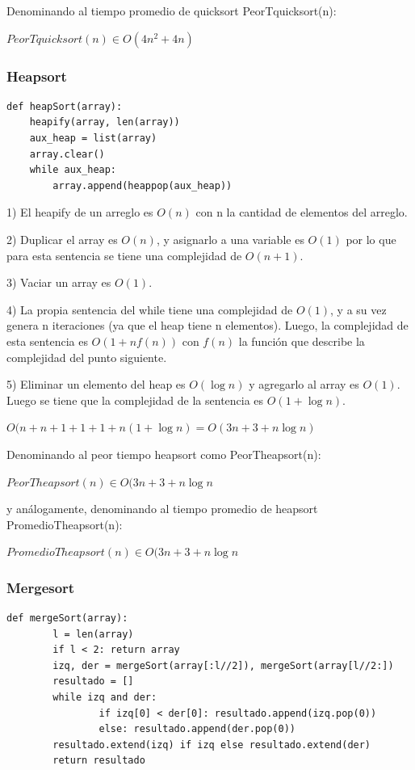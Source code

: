 \documentclass[titlepage,a4paper]{article}
\begin{document}
Denominando al tiempo promedio de quicksort PeorTquicksort(n):

$PeorTquicksort(n) \in O(4n^2 + 4n)$

\subsubsection{Heapsort}
\begin{verbatim}
def heapSort(array):
    heapify(array, len(array))
    aux_heap = list(array)
    array.clear()
    while aux_heap:
        array.append(heappop(aux_heap))
\end{verbatim}
1)  El heapify de un arreglo es $O(n)$ con n la cantidad de elementos del arreglo.

2) Duplicar el array es $O(n)$, y asignarlo a una variable es $O(1)$ por lo que para esta sentencia se tiene una complejidad de $O(n + 1)$.

3) Vaciar un array es $O(1)$. 

4) La propia sentencia del while tiene una complejidad de $O(1)$, y a su vez genera n iteraciones (ya que el heap tiene n elementos). Luego, la complejidad de esta sentencia es $O( 1 + nf(n))$ con $f(n)$ la función que describe la complejidad del punto siguiente.

5) Eliminar un elemento del heap es $O(\log n)$ y agregarlo al array es $O(1)$. Luego se tiene que la complejidad de la sentencia es $O(1 + \log n)$. 

$O( n + n +1 + 1 +1+n(1 + \log n  ) = O( 3n + 3 +n \log n )$ 

Denominando al peor tiempo heapsort como PeorTheapsort(n):

$PeorTheapsort(n)  \in O(3n + 3 +n \log n$

y análogamente, denominando al tiempo promedio de heapsort PromedioTheapsort(n):

$PromedioTheapsort(n) \in O(3n + 3 +n \log n$ 

\subsubsection{Mergesort}
\begin{verbatim}
def mergeSort(array):
        l = len(array)
        if l < 2: return array
        izq, der = mergeSort(array[:l//2]), mergeSort(array[l//2:])
        resultado = []
        while izq and der:
                if izq[0] < der[0]: resultado.append(izq.pop(0))
                else: resultado.append(der.pop(0))
        resultado.extend(izq) if izq else resultado.extend(der)
        return resultado
\end{verbatim}
\end{document}
